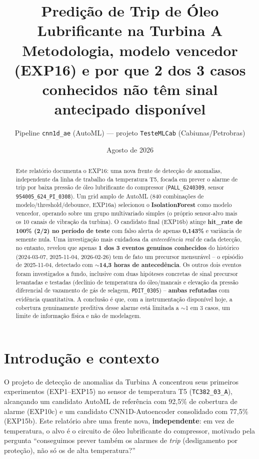 \documentclass[11pt,a4paper]{article}
\title{Predição de Trip de Óleo Lubrificante na Turbina A\\
\large Metodologia, modelo vencedor (EXP16) e por que 2 dos 3 casos\\
conhecidos não têm sinal antecipado disponível}
\author{Pipeline \texttt{cnn1d\_ae} (AutoML) --- projeto \texttt{TesteMLCab} (Cabiunas/Petrobras)}
\date{Agosto de 2026}
\begin{document}
\maketitle

\begin{abstract}
Este relatório documenta o EXP16: uma nova frente de detecção de anomalias,
independente da linha de trabalho da temperatura T5, focada em prever o
alarme de trip por baixa pressão de óleo lubrificante do compressor
(\texttt{PALL\_6240309}, sensor \texttt{954005\_624\_PI\_0308}). Um grid
amplo de AutoML (840 combinações de modelo/threshold/debounce, EXP16a)
selecionou o \textbf{IsolationForest} como modelo vencedor, operando sobre
um grupo multivariado simples (o próprio sensor-alvo mais os 10 canais de
vibração da turbina). O candidato final (EXP16b) atinge \textbf{hit\_rate
de 100\% (2/2) no período de teste} com falso alerta de apenas
\textbf{0,143\%} e variância de semente nula. Uma investigação mais
cuidadosa da \emph{antecedência real} de cada detecção, no entanto, revelou
que apenas \textbf{1 dos 3 eventos genuínos conhecidos} do histórico
(2024-03-07, 2025-11-04, 2026-02-26) tem de fato um precursor mensurável --
o episódio de 2025-11-04, detectado com \textbf{$\sim$14,3 horas de
antecedência}. Os outros dois eventos foram investigados a fundo, inclusive
com duas hipóteses concretas de sinal precursor levantadas e testadas
(declínio de temperatura do óleo/mancais e elevação da pressão diferencial
de vazamento de gás de selagem, \texttt{PDIT\_0305}) -- \textbf{ambas
refutadas} com evidência quantitativa. A conclusão é que, com a
instrumentação disponível hoje, a cobertura genuinamente preditiva desse
alarme está limitada a $\sim$1 em 3 casos, um limite de informação física
e não de modelagem.
\end{abstract}

\tableofcontents

\section{Introdução e contexto}

O projeto de detecção de anomalias da Turbina A concentrou seus primeiros
experimentos (EXP1--EXP15) no sensor de temperatura T5 (\texttt{TC382\_03\_A}),
alcançando um candidato AutoML de referência com 92,5\% de cobertura de
alarme (EXP10c) e um candidato CNN1D-Autoencoder consolidado com 77,5\%
(EXP15b). Este relatório abre uma frente nova, \textbf{independente}: em
vez de temperatura, o alvo é o circuito de óleo lubrificante do compressor,
motivado pela pergunta ``conseguimos prever também os alarmes de
\emph{trip} (desligamento por proteção), não só os de alta temperatura?''
\end{document}
